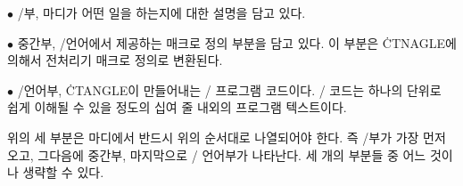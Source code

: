 \yskip\item{$\bullet$} \TEX/부, 마디가 어떤 일을 하는지에 대한 설명을 담고 있다.

\item{$\bullet$} 중간부, \CEE/언어에서 제공하는 매크로 정의 부분을 담고
있다. 이 부분은 \.{CTNAGLE}에 의해서 전처리기 매크로 정의로 변환된다.

\item{$\bullet$} \CEE/언어부, \.{CTANGLE}이 만들어내는 \CEE/ 프로그램
코드이다. \CEE/ 코드는 하나의 단위로 쉽게 이해될 수 있을 정도의 십여 줄
내외의 프로그램 텍스트이다. 

\yskip\noindent 위의 세 부분은 마디에서 반드시 위의 순서대로 나열되어야 한다. 
즉 \TEX/부가 가장 먼저 오고, 그다음에 중간부, 마지막으로 \CEE/ 언어부가
나타난다. 세 개의 부분들 중 어느 것이나 생략할 수 있다.

